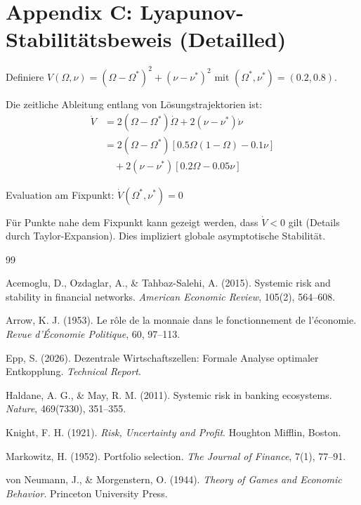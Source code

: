 \documentclass[a4paper,12pt]{article}
\theoremstyle{definition}
\begin{document}
\section{Appendix C: Lyapunov-Stabilitätsbeweis (Detailled)}

Definiere $V(\Omega, \nu) = (\Omega - \Omega^*)^2 + (\nu - \nu^*)^2$ mit $(\Omega^*, \nu^*) = (0.2, 0.8)$.

Die zeitliche Ableitung entlang von Lösungstrajektorien ist:
\begin{align}
    \dot{V} &= 2(\Omega - \Omega^*)\dot{\Omega} + 2(\nu - \nu^*)\dot{\nu} \\
    &= 2(\Omega - \Omega^*)[0.5\Omega(1-\Omega) - 0.1\nu] \\
    &\quad + 2(\nu - \nu^*)[0.2\Omega - 0.05\nu]
\end{align}

Evaluation am Fixpunkt: $\dot{V}(\Omega^*, \nu^*) = 0$

Für Punkte nahe dem Fixpunkt kann gezeigt werden, dass $\dot{V} < 0$ gilt (Details durch Taylor-Expansion). Dies impliziert globale asymptotische Stabilität.



\begin{thebibliography}{99}

Acemoglu, D., Ozdaglar, A., \& Tahbaz-Salehi, A. (2015).
\newblock Systemic risk and stability in financial networks.
\newblock \emph{American Economic Review}, 105(2), 564--608.

Arrow, K. J. (1953).
\newblock Le rôle de la monnaie dans le fonctionnement de l'économie.
\newblock \emph{Revue d'Économie Politique}, 60, 97--113.

Epp, S. (2026).
\newblock Dezentrale Wirtschaftszellen: Formale Analyse optimaler Entkopplung.
\newblock \emph{Technical Report}.

Haldane, A. G., \& May, R. M. (2011).
\newblock Systemic risk in banking ecosystems.
\newblock \emph{Nature}, 469(7330), 351--355.

Knight, F. H. (1921).
\newblock \emph{Risk, Uncertainty and Profit}.
\newblock Houghton Mifflin, Boston.

Markowitz, H. (1952).
\newblock Portfolio selection.
\newblock \emph{The Journal of Finance}, 7(1), 77--91.

von Neumann, J., \& Morgenstern, O. (1944).
\newblock \emph{Theory of Games and Economic Behavior}.
\newblock Princeton University Press.

\end{thebibliography}
\end{document}
